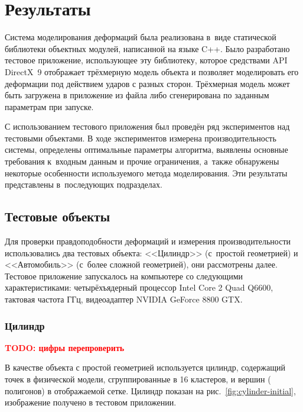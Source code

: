 \documentclass[a4paper, 14pt, titlepage]{extarticle}
\newcommand{\todo}[1]{\textbf{\textcolor{red}{TODO: #1}}}
\let\oldsection\section
\renewcommand{\section}{\newpage\oldsection}
\newcommand{\num}[1]{\numprint{#1}}
\begin{document}
  \section{Результаты}\label{sec:results}

    Система моделирования деформаций была реализована в~виде статической
    библиотеки объектных модулей, написанной на языке C++. Было разработано тестовое приложение,
    использующее эту библиотеку, которое средствами API DirectX~9 отображает трёхмерную модель
    объекта и позволяет моделировать его деформации под действием ударов с разных сторон. Трёхмерная
    модель может быть загружена в приложение из файла либо сгенерирована по заданным параметрам при
    запуске.

    С использованием тестового приложения был проведён ряд экспериментов над тестовыми объектами.
    В ходе экспериментов измерена производительность системы, определены оптимальные параметры алгоритма,
    выявлены основные требования к~входным данным и прочие ограничения, а~также обнаружены некоторые
    особенности используемого метода моделирования. Эти результаты представлены в~последующих подразделах.

    \subsection{Тестовые объекты}\label{ssec:test_objects}

      Для проверки правдоподобности деформаций и измерения производительности использовались два
      тестовых объекта: <<Цилиндр>> (с~простой геометрией) и <<Автомобиль>> (с~более сложной
      геометрией), они рассмотрены далее. Тестовое приложение запускалось на компьютере со следующими
      характеристиками: четырёхъядерный процессор Intel Core 2 Quad Q6600, тактовая частота \num{2.4} ГГц,
      видеоадаптер NVIDIA GeForce 8800 GTX.

      \subsubsection{Цилиндр}\label{sssec:cylinder}

        \todo{цифры перепроверить}

        В качестве объекта с простой геометрией используется цилиндр, содержащий
        \num{2400} точек в физической модели, сгруппированные в 16 кластеров, и \num{20000} вершин (\num{13500}
        полигонов) в отображаемой сетке. Цилиндр показан на рис.~\ref{fig:cylinder-initial},
        изображение получено в тестовом приложении.
\end{document}
